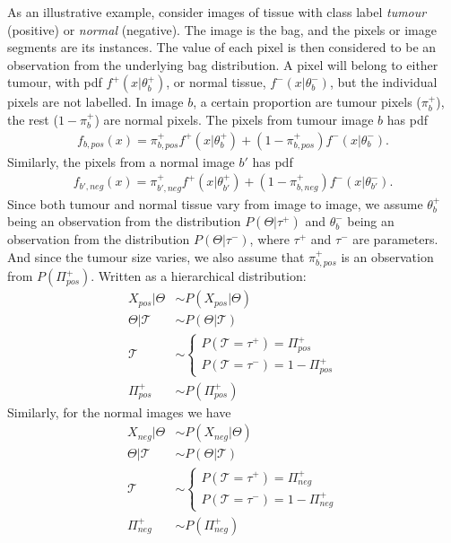 As an illustrative example, consider images of tissue with class label {\it tumour} (positive) or {\it normal} (negative). 
The image is the bag, and the pixels or image segments are its instances. 
The value of each pixel is then considered to be an observation from the underlying bag distribution. 
A pixel will belong to either tumour, with pdf $f^+(x|\theta_b^+)$, or normal tissue, $f^-(x|\theta_b^-)$, but the individual pixels are not labelled. 
In image $b$, a certain proportion are tumour pixels ($\pi^+_b$), the rest ($1-\pi^+_b$) are normal pixels.  
The pixels from tumour image $b$ has pdf
\begin{align}
  f_{b,pos}(x) = \pi^+_{b,pos} f^+(x|\theta_b^+) + (1-\pi^+_{b,pos})f^-(x|\theta_b^-).
\end{align}
Similarly, the pixels from a normal image $b'$ has pdf
\begin{align}
  f_{b',neg}(x) = \pi^+_{b',neg} f^+(x|\theta_{b'}^+) + (1-\pi^+_{b,neg})f^-(x|\theta_{b'}^-).
\end{align}
Since both tumour and normal tissue vary from image to image, we assume $\theta_b^+$ being an observation from the distribution $P(\Theta|\tau^+)$ and $\theta_b^-$ being an observation from the distribution $P(\Theta|\tau^-)$, where $\tau^+$ and $\tau^-$ are parameters. 
And since the tumour size varies, we also assume that $\pi^+_{b,pos}$ is an observation from $P(\Pi^+_{pos})$. 
Written as a hierarchical distribution: 
\begin{align}
  X_{pos}|\Theta & \sim P(X_{pos} | \Theta) \\
  \Theta|\mathcal{T} &  \sim P(\Theta|\mathcal{T}) \\
  \mathcal{T} & \sim \begin{cases}
    P(\mathcal{T} = \tau^+) = \Pi_{pos}^+\\
    P(\mathcal{T} = \tau^-)  = 1-\Pi_{pos}^+
  \end{cases} \\
  \Pi_{pos}^+ & \sim P(\Pi^+_{pos})
\end{align}
Similarly, for the normal images we have
\begin{align}
  X_{neg}|\Theta & \sim P(X_{neg} | \Theta) \\
  \Theta|\mathcal{T} &  \sim P(\Theta|\mathcal{T}) \\
  \mathcal{T} & \sim \begin{cases}
    P(\mathcal{T} = \tau^+) = \Pi_{neg}^+\\
    P(\mathcal{T} = \tau^-)  = 1-\Pi_{neg}^+
  \end{cases} \\
  \Pi_{neg}^+ & \sim P(\Pi^+_{neg})
\end{align}

